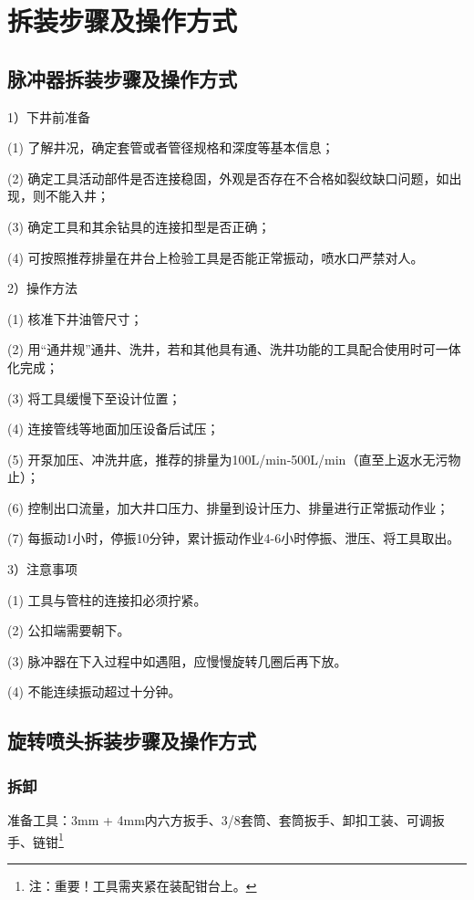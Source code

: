 \section{拆装步骤及操作方式}
\subsection{脉冲器拆装步骤及操作方式}
1）下井前准备

(1) 了解井况，确定套管或者管径规格和深度等基本信息；

(2) 确定工具活动部件是否连接稳固，外观是否存在不合格如裂纹缺口问题，如出现，则不能入井；

(3) 确定工具和其余钻具的连接扣型是否正确；

(4) 可按照推荐排量在井台上检验工具是否能正常振动，喷水口严禁对人。

2）操作方法

(1) 核准下井油管尺寸；

(2) 用“通井规”通井、洗井，若和其他具有通、洗井功能的工具配合使用时可一体化完成；

(3) 将工具缓慢下至设计位置；

(4) 连接管线等地面加压设备后试压；

(5) 开泵加压、冲洗井底，推荐的排量为100L/min-500L/min（直至上返水无污物止）；

(6) 控制出口流量，加大井口压力、排量到设计压力、排量进行正常振动作业；

(7) 每振动1小时，停振10分钟，累计振动作业4-6小时停振、泄压、将工具取出。

3）注意事项

(1) 工具与管柱的连接扣必须拧紧。

(2) 公扣端需要朝下。

(3) 脉冲器在下入过程中如遇阻，应慢慢旋转几圈后再下放。

(4) 不能连续振动超过十分钟。

\subsection{旋转喷头拆装步骤及操作方式}

\subsubsection{拆卸}

准备工具：3mm + 4mm内六方扳手、3/8\inch 套筒、套筒扳手、卸扣工装、可调扳手、链钳\footnote{注：重要！工具需夹紧在装配钳台上。}


